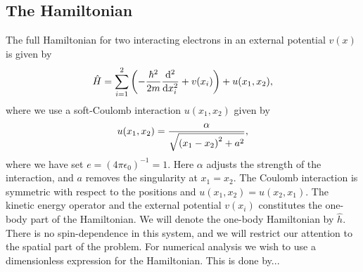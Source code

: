 \documentclass[twocolumn,superscriptaddress,unsortedaddress,
 amsmath,amssymb,
 aps,
]{revtex4-2}
\begin{document}
    \subsection{The Hamiltonian}
        The full Hamiltonian for two interacting electrons in an external
        potential $v(x)$ is given by
        \begin{align*}
            \hat{H}
            = \sum_{i = 1}^{2}\qty(
                -\frac{\hbar^2}{2m}\dv[2]{}{x_i}
                + v(x_i)
            )
            + u(x_1, x_2),
        \end{align*}
        where we use a soft-Coulomb interaction $u(x_1, x_2)$ given by
        \begin{align}
            u(x_1, x_2)
            =
            \frac{\alpha}{\sqrt{\qty(x_1 - x_2)^2 + a^2}},
            \label{eq:soft-coulomb}
        \end{align}
        where we have set $e = (4 \pi \epsilon_0)^{-1} = 1$.
        Here $\alpha$ adjusts the strength of the interaction, and $a$ removes
        the singularity at $x_1 = x_2$.
        The Coulomb interaction is symmetric with respect to the positions and
        $u(x_1, x_2) = u(x_2, x_1)$.
        The kinetic energy operator and the external potential $v(x_i)$ constitutes
        the one-body part of the Hamiltonian.
        We will denote the one-body Hamiltonian by $\hat{h}$.
        There is no spin-dependence in this system, and we will restrict our attention
        to the spatial part of the problem.
        For numerical analysis we wish to use a dimensionless expression for the
        Hamiltonian.
        This is done by...
\end{document}
